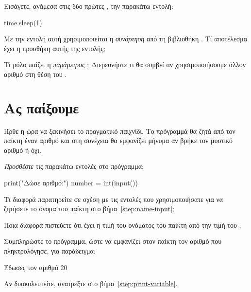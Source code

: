 \documentclass[a4paper,11pt,oneside]{book}
\begin{document}
\begin{step}
Εισάγετε, ανάμεσα στις δύο πρώτες , την παρακάτω εντολή:

\begin{pynew}
time.sleep(1)
\end{pynew}

Με την εντολή αυτή χρησιμοποιείται η \emph{συνάρτηση}  από τη βιβλιοθήκη . 
Τί αποτέλεσμα έχει η προσθήκη αυτής της εντολής;

\marginnote[14pt]{\icondiscuss}
\dottedline

Tί ρόλο παίζει η \emph{παράμετρος} ; Διερευνήστε τι θα συμβεί αν χρησιμοποιήσουμε άλλον αριθμό στη θέση του .

\marginnote[14pt]{\icondiscuss}
\dottedline
\end{step}

\section{Ας παίξουμε}

Ήρθε η ώρα να ξεκινήσει το πραγματικό παιχνίδι. Το πρόγραμμά θα ζητά από τον παίκτη έναν αριθμό και στη συνέχεια θα εμφανίζει μήνυμα αν βρήκε τον μυστικό αριθμό ή όχι.

\begin{step}
\label{step:number-input}
\emph{Προσθέστε} τις παρακάτω εντολές στο πρόγραμμα:

\begin{pynew}
print("Δώσε αριθμό:")
number = int(input())
\end{pynew}

Τι διαφορά παρατηρείτε σε σχέση με τις εντολές που χρησιμοποιήσατε για να ζητήσετε το όνομα του παίκτη στο βήμα~\ref{step:name-input};

\clearpage
\marginnote[14pt]{\icondiscuss}
\dottedline

\dottedline

Ποια διαφορά πιστεύετε ότι έχει η τιμή του ονόματος του παίκτη από την τιμή του ;


\marginnote[14pt]{\icondiscuss}
\dottedline

\dottedline
\end{step}

\begin{step}
Συμπληρώστε το πρόγραμμα, ώστε να εμφανίζει στον παίκτη τον αριθμό που πληκτρολόγησε, για παράδειγμα:

\marginnote[16pt]{\iconcomputer}
\begin{pyterm}
Έδωσες τον αριθμό 20
\end{pyterm}

Αν δυσκολευτείτε, ανατρέξτε στο βήμα~\ref{step:print-variable}.
\end{step}
\end{document}
